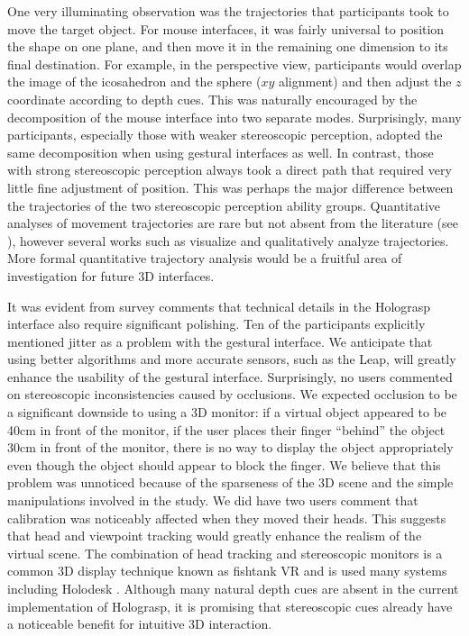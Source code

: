 \documentclass[pageno]{jpaper}
\begin{document}
One very illuminating observation was the trajectories that participants took to move the target object.
For mouse interfaces, it was fairly universal to position the shape on one plane, and then move it in the remaining one dimension 
to its final destination. For example, in the perspective view, participants would overlap the image of the icosahedron and the sphere ($xy$
alignment) and then adjust the $z$ coordinate according to depth cues. This was naturally encouraged by the decomposition of the mouse interface into two separate
modes. Surprisingly, many participants, especially those with weaker stereoscopic
perception, adopted the same decomposition when using gestural interfaces as well. In contrast, those with strong stereoscopic perception always took a direct path
that required very little fine adjustment of position. This was perhaps the major difference between the trajectories of the two stereoscopic perception ability groups. 
Quantitative analyses of movement trajectories are rare but not absent from the literature (see \cite{integralityseparability}), however
several works such as \cite{kruijff2006unconventional} visualize and qualitatively analyze trajectories. More formal quantitative trajectory analysis 
would be a fruitful area of investigation for future 3D interfaces.

It was evident from survey comments that technical details in the Holograsp interface also require significant
polishing. Ten of the participants explicitly mentioned jitter as a problem with the gestural interface. We anticipate
that using better algorithms and more accurate sensors, such as the Leap, will greatly enhance the usability of the
gestural interface. Surprisingly, no users commented on stereoscopic inconsistencies caused by occlusions. We expected
occlusion to be a significant downside to using a 3D monitor: if a virtual object appeared to be 40cm in front of the monitor, if the user
places their finger ``behind'' the object 30cm in front of the monitor, there is no way to display the object appropriately 
even though the object should appear to block the finger. We believe that this problem was unnoticed because of the sparseness of the 3D
scene and the simple manipulations involved in the study. We did have two users comment that calibration
was noticeably affected when they moved their heads. This suggests that head and viewpoint tracking would greatly enhance the 
realism of the virtual scene. The combination of head tracking and stereoscopic monitors is a common 3D display technique known as fishtank VR
and is used many systems including Holodesk \cite{holodesk}. Although many natural depth cues are absent in the current implementation of Holograsp, it is promising that
stereoscopic cues already have a noticeable benefit for intuitive 3D interaction.
\end{document}
